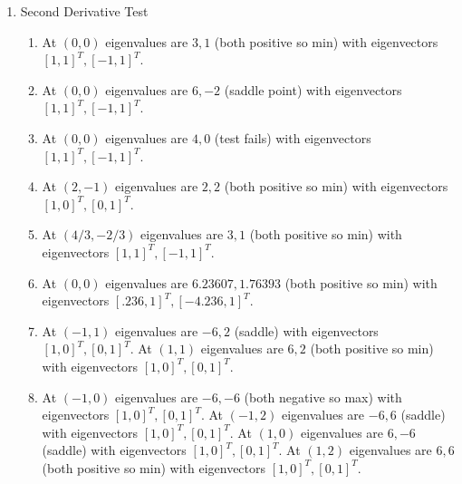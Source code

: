 {\begin{multicols}{2}
\begin{enumerate}



\item Second Derivative Test
\begin{enumerate}
\item At $(0,0)$ eigenvalues are $3,1$ (both positive so min) with eigenvectors $[1,1]^T,[-1,1]^T$.
\item At $(0,0)$ eigenvalues are $6,-2$ (saddle point) with eigenvectors $[1,1]^T,[-1,1]^T$.
\item At $(0,0)$ eigenvalues are $4,0$ (test fails) with eigenvectors $[1,1]^T,[-1,1]^T$.
\item At $(2,-1)$ eigenvalues are $2,2$ (both positive so min) with eigenvectors $[1,0]^T,[0,1]^T$.
\item At $(4/3,-2/3)$ eigenvalues are $3,1$ (both positive so min) with eigenvectors $[1,1]^T,[-1,1]^T$.
\item At $(0,0)$ eigenvalues are $6.23607,1.76393$ (both positive so min) with eigenvectors $[.236,1]^T,[-4.236,1]^T$.
\item 
At $(-1,1)$ eigenvalues are $-6,2$ (saddle) with eigenvectors $[1,0]^T,[0,1]^T$.
At $(1,1)$ eigenvalues are $6,2$ (both positive so min) with eigenvectors $[1,0]^T,[0,1]^T$.
\item 
At $(-1,0)$ eigenvalues are $-6,-6$ (both negative so max) with eigenvectors $[1,0]^T,[0,1]^T$.
At $(-1,2)$ eigenvalues are $-6,6$ (saddle) with eigenvectors $[1,0]^T,[0,1]^T$.
At $(1,0)$ eigenvalues are $6,-6$ (saddle) with eigenvectors $[1,0]^T,[0,1]^T$.
At $(1,2)$ eigenvalues are $6,6$ (both positive so min) with eigenvectors $[1,0]^T,[0,1]^T$.


\end{enumerate}
\end{enumerate}
\end{multicols}}
